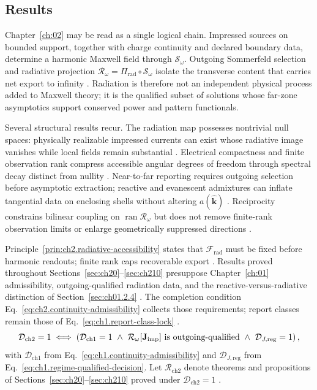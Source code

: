 \subsection{Results}
\label{sec:ch02111}

Chapter~\ref{ch:02} may be read as a single logical chain. Impressed sources on bounded support,
together with charge continuity and declared boundary data, determine a harmonic Maxwell field
through $\mathcal{S}_\omega$. Outgoing Sommerfeld selection and radiative projection
$\mathcal{R}_\omega=\Pi_{\mathrm{rad}}\circ\mathcal{S}_\omega$ isolate the transverse content
that carries net export to infinity \cite{maxwell1873,stratton1941,sommerfeld1949}. Radiation is
therefore not an independent physical process added to Maxwell theory; it is the qualified
subset of solutions whose far-zone asymptotics support conserved power and pattern functionals.

Several structural results recur. The radiation map possesses nontrivial null spaces:
physically realizable impressed currents can exist whose radiative image vanishes while local
fields remain substantial \cite{devaney2004}. Electrical compactness and finite observation rank
compress accessible angular degrees of freedom through spectral decay distinct from nullity
\cite{chu1948,hansen1988}. Near-to-far reporting requires outgoing selection before asymptotic
extraction; reactive and evanescent admixtures can inflate tangential data on enclosing shells
without altering $a(\widehat{\mathbf{k}})$ \cite{stratton1941}. Reciprocity constrains bilinear
coupling on $\operatorname{ran}\mathcal{R}_\omega$ but does not remove finite-rank observation
limits or enlarge geometrically suppressed directions \cite{stratton1941,jackson1999}.

Principle~\ref{prin:ch2.radiative-accessibility} states that $\mathcal{F}_{\mathrm{rad}}$ must be
fixed before harmonic readouts; finite rank caps recoverable export \cite{stratton1941}. Results
proved throughout Sections~\ref{sec:ch20}--\ref{sec:ch210} presuppose Chapter~\ref{ch:01}
admissibility, outgoing-qualified radiation data, and the reactive-versus-radiative distinction of
Section~\ref{sec:ch01.2.4} \cite{stratton1941}. The completion condition
Eq.~\eqref{eq:ch2.continuity-admissibility} collects those requirements; report classes remain
those of Eq.~\eqref{eq:ch1.report-class-lock} \cite{stratton1941}.
\medskip
\begin{equation}
\label{eq:ch2.continuity-admissibility}
\mathcal{D}_{\mathrm{ch2}}=1
\iff
\left(
\mathcal{D}_{\mathrm{ch1}}=1\
\wedge\
\mathcal{R}_\omega[\mathbf{J}_{\mathrm{imp}}]\ \text{is outgoing-qualified}\
\wedge\
\mathcal{D}_{J,\mathrm{reg}}=1
\right),
\end{equation}
with \(\mathcal{D}_{\mathrm{ch1}}\) from Eq.~\eqref{eq:ch1.continuity-admissibility} and
\(\mathcal{D}_{J,\mathrm{reg}}\) from Eq.~\eqref{eq:ch1.regime-qualified-decision}.
Let \(\mathcal{R}_{\mathrm{ch2}}\) denote theorems and propositions of
Sections~\ref{sec:ch20}--\ref{sec:ch210} proved under \(\mathcal{D}_{\mathrm{ch2}}=1\)
\cite{stratton1941}.